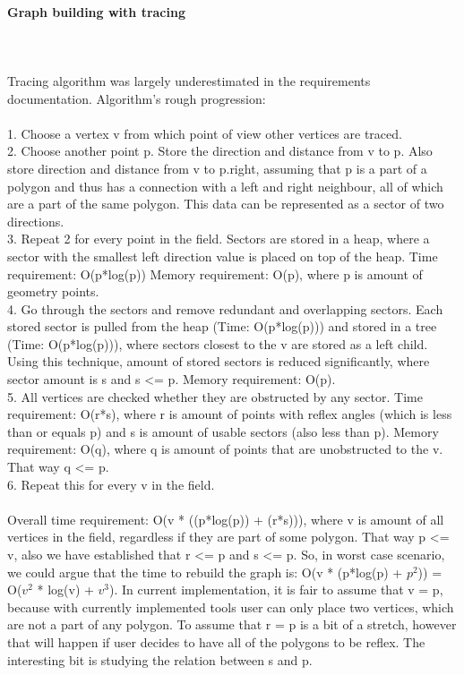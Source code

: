 \documentclass[a4paper,12pt]{article}
\begin{document}
\paragraph{\large Graph building with tracing} \hspace{0pt} \\
\\
Tracing algorithm was largely underestimated in the requirements documentation. Algorithm's rough progression: \\
\\
1. Choose a vertex v from which point of view other vertices are traced.\\
2. Choose another point p. Store the direction and distance from v to p. Also store direction and distance from v to p.right, assuming that p is a part of a polygon and thus has a connection with a left and right neighbour, all of which are a part of the same polygon. This data can be represented as a sector of two directions.\\
3. Repeat 2 for every point in the field. Sectors are stored in a heap, where a sector with the smallest left direction value is placed on top of the heap. Time requirement: O(p*log(p)) Memory requirement: O(p), where p is amount of geometry points.\\
4. Go through the sectors and remove redundant and overlapping sectors. Each stored sector is pulled from the heap (Time: O(p*log(p))) and stored in a tree (Time: O(p*log(p))), where sectors closest to the v are stored as a left child. Using this technique, amount of stored sectors is reduced significantly, where sector amount is s and s \textless = p. Memory requirement: O(p).\\
5. All vertices are checked whether they are obstructed by any sector. Time requirement: O(r*s), where r is amount of points with reflex angles (which is less than or equals p) and s is amount of usable sectors (also less than p). Memory requirement: O(q), where q is amount of points that are unobstructed to the v. That way q \textless = p.\\
6. Repeat this for every v in the field.\\
\\
Overall time requirement: O(v * ((p*log(p)) + (r*s))), where v is amount of all vertices in the field, regardless if they are part of some polygon. That way p \textless = v, also we have established that r \textless = p and s \textless = p. So, in worst case scenario, we could argue that the time to rebuild the graph is: O(v * (p*log(p) + $p^{2}$)) = O($v^{2}$ * log(v) + $v^{3}$). In current implementation, it is fair to assume that v = p, because with currently implemented tools user can only place two vertices, which are not a part of any polygon. To assume that r = p is a bit of a stretch, however that will happen if user decides to have all of the polygons to be reflex. The interesting bit is studying the relation between s and p.\\
\end{document}
